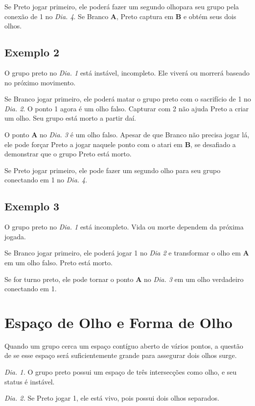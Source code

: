Se Preto jogar primeiro, ele poderá fazer um segundo olhopara seu grupo pela conexão de 1 no \emph{Dia. 4}. Se Branco \textbf{A}, Preto captura em \textbf{B} e obtém seus dois olhos.

\subsection{Exemplo 2}

O grupo preto no \emph{Dia. 1} está instável, incompleto. Ele viverá ou morrerá baseado no próximo movimento.

Se Branco jogar primeiro, ele poderá matar o grupo preto com o sacrifício de 1 no \emph{Dia. 2}. O ponto 1 agora é um olho falso. Capturar com 2 não ajuda Preto a criar um olho. Seu grupo está morto a partir daí.

O ponto \textbf{A} no \emph{Dia. 3} é um olho falso. Apesar de que Branco não precisa jogar lá, ele pode forçar Preto a jogar naquele ponto com o atari em \textbf{B}, se desafiado a demonstrar que o grupo Preto está morto.

Se Preto jogar primeiro, ele pode fazer um segundo olho para seu grupo conectando em 1 no \emph{Dia. 4}.

\subsection{Exemplo 3}

O grupo preto no \emph{Dia. 1} está incompleto. Vida ou morte dependem da próxima jogada.

Se Branco jogar primeiro, ele poderá jogar 1 no \emph{Dia 2} e transformar o olho em \textbf{A} em um olho falso. Preto está morto.

Se for turno preto, ele pode tornar o ponto \textbf{A} no \emph{Dia. 3} em um olho verdadeiro conectando em 1. 

\section{Espaço de Olho e Forma de Olho}

Quando um grupo cerca um espaço contíguo aberto de vários pontos, a questão de se esse espaço será suficientemente grande para assegurar dois olhos surge.

\emph{Dia. 1.} O grupo preto possui um espaço de três intersecções como olho, e seu status é instável.

\emph{Dia. 2.} Se Preto jogar 1, ele está vivo, pois possui dois olhos separados.


